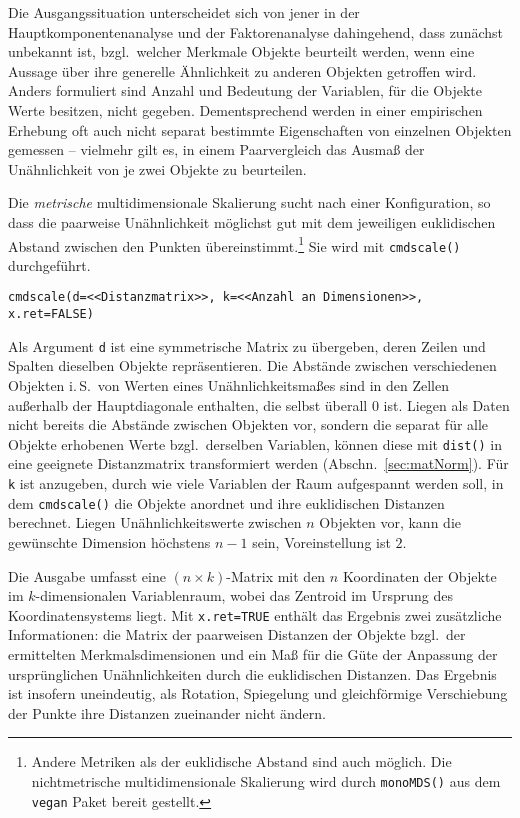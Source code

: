 Die Ausgangssituation unterscheidet sich von jener in der Hauptkomponentenanalyse und der Faktorenanalyse dahingehend, dass zunächst unbekannt ist, bzgl.\ welcher Merkmale Objekte beurteilt werden, wenn eine Aussage über ihre generelle Ähnlichkeit zu anderen Objekten getroffen wird. Anders formuliert sind Anzahl und Bedeutung der Variablen, für die Objekte Werte besitzen, nicht gegeben. Dementsprechend werden in einer empirischen Erhebung oft auch nicht separat bestimmte Eigenschaften von einzelnen Objekten gemessen -- vielmehr gilt es, in einem Paarvergleich das Ausmaß der Unähnlichkeit von je zwei Objekte zu beurteilen.

Die \emph{metrische} multidimensionale Skalierung sucht nach einer Konfiguration, so dass die paarweise Unähnlichkeit möglichst gut mit dem jeweiligen euklidischen Abstand zwischen den Punkten übereinstimmt.\footnote{Andere Metriken als der euklidische Abstand sind auch möglich. Die nichtmetrische multidimensionale Skalierung wird durch \lstinline!monoMDS()! aus dem \lstinline!vegan! Paket \cite{Oksanen2011} bereit gestellt.} Sie wird mit \lstinline!cmdscale()! durchgeführt.
\begin{lstlisting}
cmdscale(d=<<Distanzmatrix>>, k=<<Anzahl an Dimensionen>>, x.ret=FALSE)
\end{lstlisting}

Als Argument \lstinline!d! ist eine symmetrische Matrix zu übergeben, deren Zeilen und Spalten dieselben Objekte repräsentieren. Die Abstände zwischen verschiedenen Objekten i.\,S.\ von Werten eines Unähnlichkeitsmaßes sind in den Zellen außerhalb der Hauptdiagonale enthalten, die selbst überall $0$ ist. Liegen als Daten nicht bereits die Abstände zwischen Objekten vor, sondern die separat für alle Objekte erhobenen Werte bzgl.\ derselben Variablen, können diese mit \lstinline!dist()! in eine geeignete Distanzmatrix transformiert werden (Abschn.\ \ref{sec:matNorm}). Für \lstinline!k! ist anzugeben, durch wie viele Variablen der Raum aufgespannt werden soll, in dem \lstinline!cmdscale()! die Objekte anordnet und ihre euklidischen Distanzen berechnet. Liegen Unähnlichkeitswerte zwischen $n$ Objekten vor, kann die gewünschte Dimension höchstens $n-1$ sein, Voreinstellung ist $2$.

Die Ausgabe umfasst eine $(n \times k)$-Matrix mit den $n$ Koordinaten der Objekte im $k$-dimensionalen Variablenraum, wobei das Zentroid im Ursprung des Koordinatensystems liegt. Mit \lstinline!x.ret=TRUE! enthält das Ergebnis zwei zusätzliche Informationen: die Matrix der paarweisen Distanzen der Objekte bzgl.\ der ermittelten Merkmalsdimensionen und ein Maß für die Güte der Anpassung der ursprünglichen Unähnlichkeiten durch die euklidischen Distanzen. Das Ergebnis ist insofern uneindeutig, als Rotation, Spiegelung und gleichförmige Verschiebung der Punkte ihre Distanzen zueinander nicht ändern.

